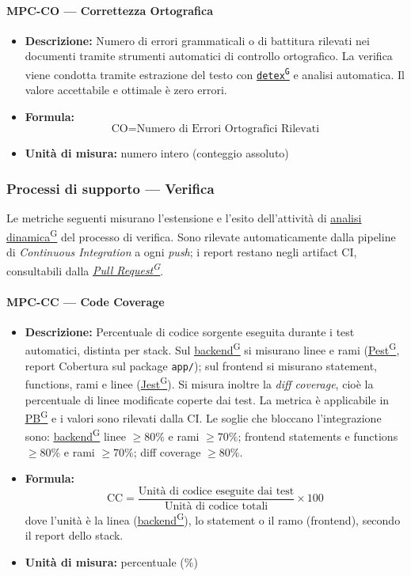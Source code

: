 \documentclass[a4paper,12pt]{article}
\providecommand{\glslink}[2]{\href{https://alittlebyte-19.github.io/Documentazione/glossario.html\#gls-#1}{\underline{#2}\textsuperscript{\scriptsize G}}}
\begin{document}
\paragraph{MPC-CO --- Correttezza Ortografica}
\begin{itemize}
    \item \textbf{Descrizione:} Numero di errori grammaticali o di battitura rilevati nei documenti tramite strumenti automatici di controllo ortografico. La verifica viene condotta tramite estrazione del testo con \texttt{\glslink{detex}{detex}} e analisi automatica. Il valore accettabile e ottimale è zero errori.
    \item \textbf{Formula:}
    $$\text{CO} = \text{Numero di Errori Ortografici Rilevati}$$
    \item \textbf{Unità di misura:} numero intero (conteggio assoluto)
\end{itemize}

\subsubsection{Processi di supporto --- Verifica}
Le metriche seguenti misurano l'estensione e l'esito dell'attività di \glslink{analisi-dinamica}{analisi dinamica} del processo di verifica. Sono rilevate automaticamente dalla pipeline di \textit{Continuous Integration} a ogni \textit{push}; i report restano negli artifact CI, consultabili dalla \textit{\glslink{pull-request}{Pull Request}}.

\paragraph{MPC-CC --- Code Coverage}
\begin{itemize}
    \item \textbf{Descrizione:} Percentuale di codice sorgente eseguita durante i test automatici, distinta per stack. Sul \glslink{backend}{backend} si misurano linee e rami (\glslink{pest}{Pest}, report Cobertura sul package \texttt{app/}); sul frontend si misurano statement, functions, rami e linee (\glslink{jest}{Jest}). Si misura inoltre la \textit{diff coverage}, cioè la percentuale di linee modificate coperte dai test. La metrica è applicabile in \glslink{pb-product-baseline}{PB} e i valori sono rilevati dalla CI. Le soglie che bloccano l'integrazione sono: \glslink{backend}{backend} linee $\geq 80\%$ e rami $\geq 70\%$; frontend statements e functions $\geq 80\%$ e rami $\geq 70\%$; diff coverage $\geq 80\%$.
    \item \textbf{Formula:}
    $$\text{CC} = \frac{\text{Unità di codice eseguite dai test}}{\text{Unità di codice totali}} \times 100$$
    dove l'unità è la linea (\glslink{backend}{backend}), lo statement o il ramo (frontend), secondo il report dello stack.
    \item \textbf{Unità di misura:} percentuale (\%)
\end{itemize}
\end{document}
